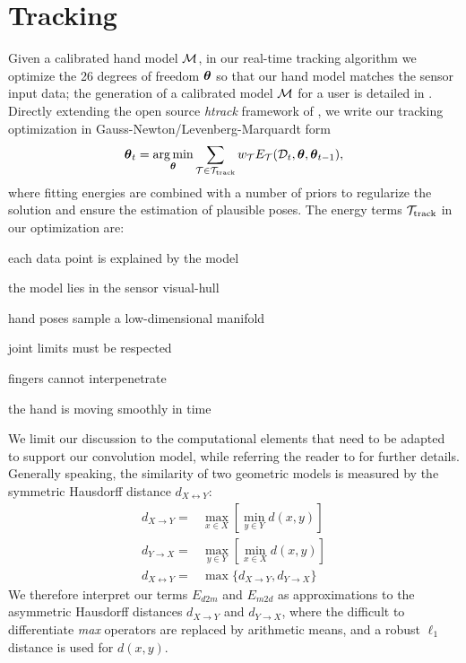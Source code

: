 

\section{Tracking}
\label{sec:tracking}
Given a calibrated hand model $\mathcal{M}$, in our real-time tracking algorithm we optimize the 26 degrees of freedom $\boldsymbol{\theta}$  so that our hand model matches the sensor input data; the generation of a calibrated model $\mathcal{M}$ for a user is detailed in . Directly extending the open source \emph{htrack} framework of \cite{tagliasacchi2015robust}, we write our tracking optimization in Gauss-Newton/Levenberg-Marquardt form
% 
\begin{eqnarray}
\boldsymbol{\theta}_t = \operatorname*{arg\,min}_{\boldsymbol{\theta}}
\sum_{\mathcal{T} \in {\mathcal{T}_\text{track}}} 
w_\mathcal{T} E_\mathcal{T}(\mathcal{D}_t,\boldsymbol{\theta},\boldsymbol{\theta}_{t-1}),
\label{eq:htrack}
\end{eqnarray}
% 
where fitting energies are combined with a number of priors to regularize the solution and ensure the estimation of plausible poses. The energy terms ${\mathcal{T}_\text{track}}$ in our optimization are:
% 
\begin{description}[labelsep=0em,labelwidth=.6in,labelindent=.25cm,itemsep=-.6em]
    \item[d2m]          each data point is explained by the model
    \item[m2d]          the model lies in the sensor visual-hull
    \item[pose]         hand poses sample a low-dimensional manifold
    \item[limits]       joint limits must be respected
    \item[collision]    fingers cannot interpenetrate
    \item[temporal]     the hand is moving smoothly in time
\end{description}
% 
We limit our discussion to the computational elements that need to be adapted to support our convolution model, while referring the reader to \cite{tagliasacchi2015robust} for further details. 
% 
Generally speaking, the similarity of two geometric models is measured by the symmetric Hausdorff distance $d_{X \leftrightarrow Y}$:
% 
\begin{eqnarray*}
d_{X \rightarrow Y} =& \max_{x \in X} \left[ \min_{y \in Y} d(x,y) \right] \\
d_{Y \rightarrow X} =& \max_{y \in Y} \left[ \min_{x \in X} d(x,y) \right] \\
d_{X \leftrightarrow Y} =& \max \{ d_{X \rightarrow Y}, d_{Y \rightarrow X} \}
\end{eqnarray*}
We therefore interpret our terms $E_{d2m}$ and $E_{m2d}$ as approximations to the asymmetric Hausdorff distances $d_{X \rightarrow Y}$ and $d_{Y \rightarrow X}$, where the difficult to differentiate \emph{max} operators are replaced by arithmetic means, and a robust $\ell_1$ distance is used for $d(x,y)$. 

